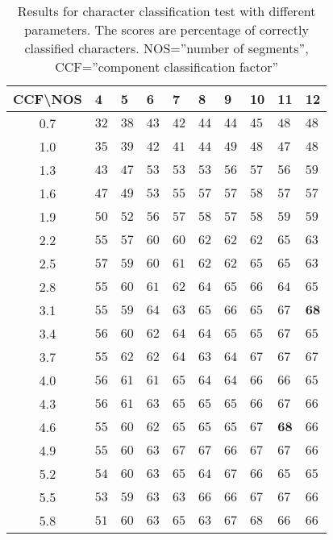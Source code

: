 \begin{table}[htb]
  \begin{center}
  \begin{tabular}{ c | l l l l l l l l l }
CCF\textbackslash NOS &    4   & 5      & 6      & 7      & 8      & 9      & 10     & 11     & 12 \\ \hline
0.7     &  $32$  &  $38$  &  $43$  &  $42$  &  $44$  &  $44$  &  $45$  &  $48$  &  $48$  \\
1.0     &  $35$  &  $39$  &  $42$  &  $41$  &  $44$  &  $49$  &  $48$  &  $47$  &  $48$  \\
1.3     &  $43$  &  $47$  &  $53$  &  $53$  &  $53$  &  $56$  &  $57$  &  $56$  &  $59$  \\
1.6     &  $47$  &  $49$  &  $53$  &  $55$  &  $57$  &  $57$  &  $58$  &  $57$  &  $57$  \\
1.9     &  $50$  &  $52$  &  $56$  &  $57$  &  $58$  &  $57$  &  $58$  &  $59$  &  $59$  \\
2.2     &  $55$  &  $57$  &  $60$  &  $60$  &  $62$  &  $62$  &  $62$  &  $65$  &  $63$  \\
2.5     &  $57$  &  $59$  &  $60$  &  $61$  &  $62$  &  $62$  &  $65$  &  $65$  &  $63$  \\
2.8     &  $55$  &  $60$  &  $61$  &  $62$  &  $64$  &  $65$  &  $66$  &  $64$  &  $65$  \\
3.1     &  $55$  &  $59$  &  $64$  &  $63$  &  $65$  &  $66$  &  $65$  &  $67$  &  $\textbf{68}$  \\
3.4     &  $56$  &  $60$  &  $62$  &  $64$  &  $64$  &  $65$  &  $65$  &  $67$  &  $65$  \\
3.7     &  $55$  &  $62$  &  $62$  &  $64$  &  $63$  &  $64$  &  $67$  &  $67$  &  $67$  \\
4.0     &  $56$  &  $61$  &  $61$  &  $65$  &  $64$  &  $64$  &  $66$  &  $66$  &  $65$  \\
4.3     &  $56$  &  $61$  &  $63$  &  $65$  &  $65$  &  $65$  &  $66$  &  $67$  &  $66$  \\
4.6     &  $55$  &  $60$  &  $62$  &  $65$  &  $65$  &  $65$  &  $67$  &  $\textbf{68}$  &  $66$  \\
4.9     &  $55$  &  $60$  &  $63$  &  $67$  &  $67$  &  $66$  &  $67$  &  $67$  &  $66$  \\
5.2     &  $54$  &  $60$  &  $63$  &  $65$  &  $64$  &  $67$  &  $66$  &  $65$  &  $65$  \\
5.5     &  $53$  &  $59$  &  $63$  &  $63$  &  $66$  &  $66$  &  $67$  &  $67$  &  $66$  \\
5.8     &  $51$  &  $60$  &  $63$  &  $65$  &  $63$  &  $67$  &  $68$  &  $66$  &  $66$  \\
  \end{tabular}
\end{center}
\caption{Results for character classification test with different parameters. The scores are percentage of correctly classified characters.
	 NOS=''number of segments'',
         CCF=''component classification factor''}
\label{tab:character_classifier_results_different_parameters} 
\end{table}

